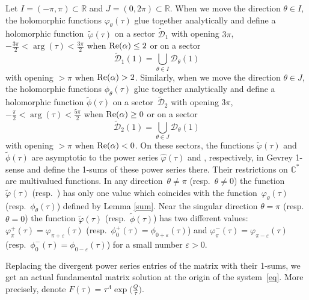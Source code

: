 \documentclass[pdftex]{sigma}
\numberwithin{equation}{section}
\begin{document}
 \begin{Remark}\label{sum1}
 Let $I =(-\pi, \pi) \subset \mathbb{R}$ and $J=(0, 2 \pi) \subset \mathbb{R}$. When we move the direction $\theta\in I$, the
 holomorphic functions $\varphi_{\theta}(\tau)$ glue together analytically and define a holomorphic function~$\tilde{\varphi}(\tau)$ on a sector $\widetilde{\mathcal{D}}_1$ with opening
 $3 \pi$, $-\frac{3 \pi}{2} < \arg (\tau) < \frac{3 \pi}{2}$ when ${\rm Re}(\alpha) \leq 2$ or on a sector
 \[
 \widetilde{\mathcal{D}}_1(1)=\bigcup _{\theta\in I} \mathcal{D}_{\theta}(1)
 \]
 with opening $> \pi$ when ${\rm Re}(\alpha) > 2$.
 Similarly, when we move the direction $\theta\in J$, the
 holomorphic functions $\phi_{\theta}(\tau)$ glue together analytically and define a holomorphic function
 $\tilde{\phi}(\tau)$ on a sector~$\widetilde{\mathcal{D}}_2$ with opening
 $3 \pi$, $-\frac{\pi}{2} < \arg (\tau) < \frac{5 \pi}{2}$ when ${\rm Re}(\alpha) \geq 0$ or on a sector
 \[
 \widetilde{\mathcal{D}}_2(1)=\bigcup _{\theta\in J} \mathcal{D}_{\theta}(1)
 \]
 with opening $> \pi$ when ${\rm Re}(\alpha) < 0$. On these sectors, the functions $\tilde{\varphi}(\tau)$ and
 $\tilde{\phi}(\tau)$ are asymptotic to the power series $\hat{\varphi}(\tau)$ and \smash{$\hat{\phi}(\tau)$}, respectively,
 in Gevrey 1-sense and define the 1-sums of these power series there. Their restrictions on $\mathbb{C}^*$ are multivalued
 functions. In any direction~${\theta\neq \pi}$ (resp.\ $\theta\neq 0$) the function $\tilde{\varphi}(\tau)$
 \big(resp.\ \smash{$\tilde{\phi}(\tau)$}\big) has only one value which coincides with the function~$\varphi_{\theta}(\tau)$
 (resp.\ $\phi_{\theta}(\tau)$) defined by Lemma \ref{sum}. Near the singular direction $\theta=\pi$
 (resp.\ $\theta=0$) the function $\tilde{\varphi}(\tau)$ \big(resp.\ $\tilde{\phi}(\tau)$\big) has two different values:
 $\varphi^{+}_{\pi}(\tau)=\varphi_{\pi+\varepsilon}(\tau)$
 \big(resp.~${\phi^{+}_{0}(\tau)=\phi_{0+\varepsilon}(\tau)}$\big) and $\varphi^{-}_{\pi}(\tau)=\varphi_{\pi-\varepsilon}(\tau)$
 (resp.\ $\phi^{-}_{0}(\tau)=\phi_{0-\varepsilon}(\tau)$) for a small number $\varepsilon>0$.

 \end{Remark}

 Replacing the divergent power series entries of the matrix  with their 1-sums, we get an actual fundamental
 matrix solution at the origin of the system~\eqref{eq}. More precisely,
 denote $F(\tau)=\tau^{\Lambda} \exp\bigl(\frac{Q}{\tau}\bigr)$.
\end{document}
